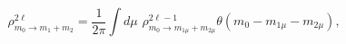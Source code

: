 \begin{equation}
 \rho^{2\ell}_{m_0\rightarrow m_1+m_2}\!=\frac{1}{2\pi}\int d\mu\,\,
 \rho^{2\ell-1}_{m_0\rightarrow m_{1\mu}+m_{2\mu}}
 \theta(m_0-m_{1\mu}-m_{2\mu}), 
\end{equation}

